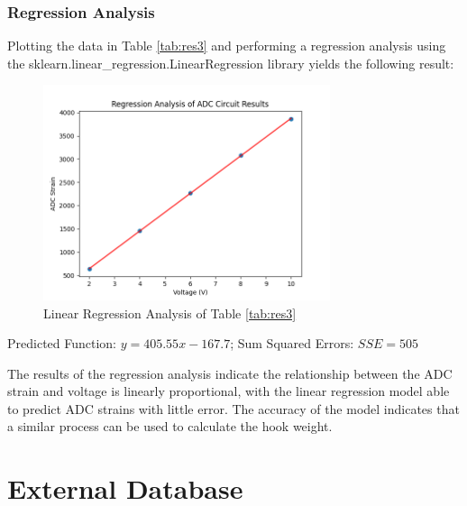 \documentclass[12pt, a4paper]{article}
\begin{document}
\subsubsection{Regression Analysis}
Plotting the data in Table \ref{tab:res3} and performing a regression analysis using the sklearn.linear\_regression.LinearRegression library yields the following
result:
\begin{figure}[H]
    \centering
    \includegraphics[width=0.75\textwidth]{adc_graph.png}
    \caption{Linear Regression Analysis of Table \ref{tab:res3}}
    \label{fig:regr_test}
\end{figure}
\begin{center}
    Predicted Function: $y=405.55x-167.7$; 
    Sum Squared Errors: $SSE=505$
\end{center}
The results of the regression analysis indicate the relationship between the ADC strain and voltage is linearly proportional, with the linear regression
model able to predict ADC strains with little error. The accuracy of the model indicates that a similar process can be used to calculate the hook weight.



\newpage

\section{External Database}



\newpage

\end{document}
